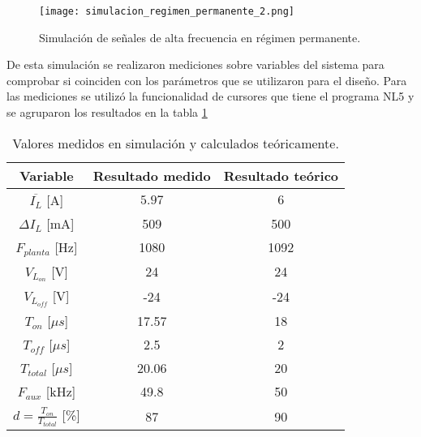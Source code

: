 \begin{figure}[H]
	\centering
	\texttt{[image: simulacion\_regimen\_permanente\_2.png]}
	\caption{Simulación de señales de alta frecuencia en régimen permanente.}
	\label{fig:simulacion_regimen_permanente_2}
\end{figure}


De esta simulación se realizaron mediciones sobre variables del sistema para comprobar si coinciden con los parámetros que se utilizaron para el diseño. Para las mediciones se utilizó la funcionalidad de cursores que tiene el programa NL5 y se agruparon los resultados en la tabla \ref{tab_mediciones_simulacion}


\begin{table}[H]
	\begin{center}
		\begin{tabular}{| c | c | c |}
			\hline
			Variable & Resultado medido & Resultado teórico \\ \hline
			$\overline{I_L}$ [A] & $5.97$ & $6$ \\ \hline
			$\Delta I_L$ [mA] & 509 & 500 \\ \hline
			$F_{planta}$ [Hz]& 1080 &	1092 \\ \hline
			$V_{L_{on}}$ [V]&	24 & 24 \\ \hline
			$V_{L_{off}}$ [V]& -24 & -24 \\ \hline
			$T_{on}$ [$\mu s$] & 17.57 & 18 \\ \hline
			$T_{off}$ [$\mu s$] & 2.5 & 2 \\ \hline
			$T_{total}$ [$\mu s$] & 20.06 & 20 \\ \hline
			$F_{aux}$ [kHz] & 49.8 & 50 \\ \hline
			$d=\frac{T_{on}}{T_{total}}$ [\%] & 87 & 90 \\ \hline
		\end{tabular}
		\caption{Valores medidos en simulación y calculados teóricamente.}
		\label{tab_mediciones_simulacion}
	\end{center}
\end{table}

%

